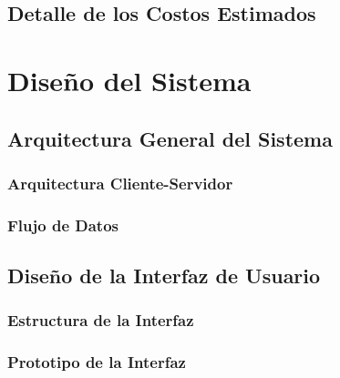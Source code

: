 \subsection{Detalle de los Costos Estimados}

\section{Diseño del Sistema}
\subsection{Arquitectura General del Sistema}
\subsubsection{Arquitectura Cliente-Servidor}
\subsubsection{Flujo de Datos}

\subsection{Diseño de la Interfaz de Usuario}
\subsubsection{Estructura de la Interfaz}
\subsubsection{Prototipo de la Interfaz}
